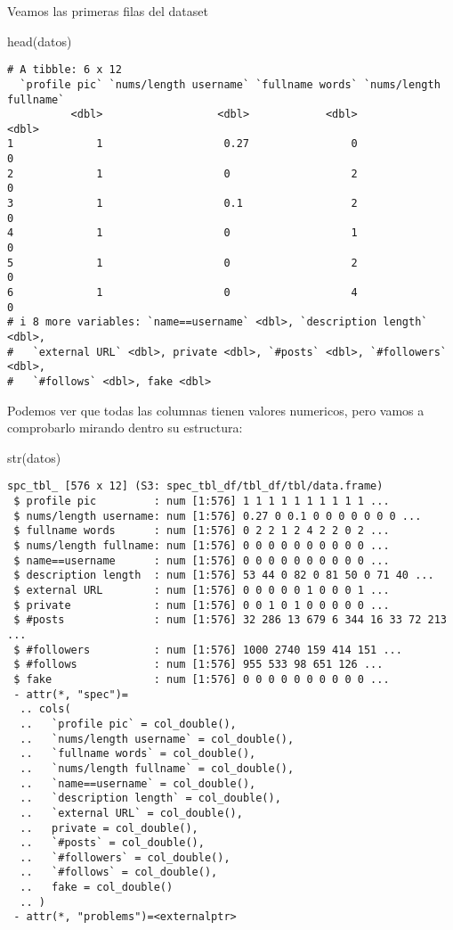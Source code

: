 \documentclass[
  letterpaper,
  DIV=11,
  numbers=noendperiod]{scrreprt}
\newenvironment{Shaded}{\begin{snugshade}}{\end{snugshade}}
\newcommand{\FunctionTok}[1]{\textcolor[rgb]{0.28,0.35,0.67}{#1}}
\newcommand{\NormalTok}[1]{\textcolor[rgb]{0.00,0.23,0.31}{#1}}
\begin{document}
Veamos las primeras filas del dataset

\begin{Shaded}
\begin{Highlighting}[]
\FunctionTok{head}\NormalTok{(datos)}
\end{Highlighting}
\end{Shaded}

\begin{verbatim}
# A tibble: 6 x 12
  `profile pic` `nums/length username` `fullname words` `nums/length fullname`
          <dbl>                  <dbl>            <dbl>                  <dbl>
1             1                   0.27                0                      0
2             1                   0                   2                      0
3             1                   0.1                 2                      0
4             1                   0                   1                      0
5             1                   0                   2                      0
6             1                   0                   4                      0
# i 8 more variables: `name==username` <dbl>, `description length` <dbl>,
#   `external URL` <dbl>, private <dbl>, `#posts` <dbl>, `#followers` <dbl>,
#   `#follows` <dbl>, fake <dbl>
\end{verbatim}

Podemos ver que todas las columnas tienen valores numericos, pero vamos
a comprobarlo mirando dentro su estructura:

\begin{Shaded}
\begin{Highlighting}[]
\FunctionTok{str}\NormalTok{(datos)}
\end{Highlighting}
\end{Shaded}

\begin{verbatim}
spc_tbl_ [576 x 12] (S3: spec_tbl_df/tbl_df/tbl/data.frame)
 $ profile pic         : num [1:576] 1 1 1 1 1 1 1 1 1 1 ...
 $ nums/length username: num [1:576] 0.27 0 0.1 0 0 0 0 0 0 0 ...
 $ fullname words      : num [1:576] 0 2 2 1 2 4 2 2 0 2 ...
 $ nums/length fullname: num [1:576] 0 0 0 0 0 0 0 0 0 0 ...
 $ name==username      : num [1:576] 0 0 0 0 0 0 0 0 0 0 ...
 $ description length  : num [1:576] 53 44 0 82 0 81 50 0 71 40 ...
 $ external URL        : num [1:576] 0 0 0 0 0 1 0 0 0 1 ...
 $ private             : num [1:576] 0 0 1 0 1 0 0 0 0 0 ...
 $ #posts              : num [1:576] 32 286 13 679 6 344 16 33 72 213 ...
 $ #followers          : num [1:576] 1000 2740 159 414 151 ...
 $ #follows            : num [1:576] 955 533 98 651 126 ...
 $ fake                : num [1:576] 0 0 0 0 0 0 0 0 0 0 ...
 - attr(*, "spec")=
  .. cols(
  ..   `profile pic` = col_double(),
  ..   `nums/length username` = col_double(),
  ..   `fullname words` = col_double(),
  ..   `nums/length fullname` = col_double(),
  ..   `name==username` = col_double(),
  ..   `description length` = col_double(),
  ..   `external URL` = col_double(),
  ..   private = col_double(),
  ..   `#posts` = col_double(),
  ..   `#followers` = col_double(),
  ..   `#follows` = col_double(),
  ..   fake = col_double()
  .. )
 - attr(*, "problems")=<externalptr> 
\end{verbatim}
\end{document}
